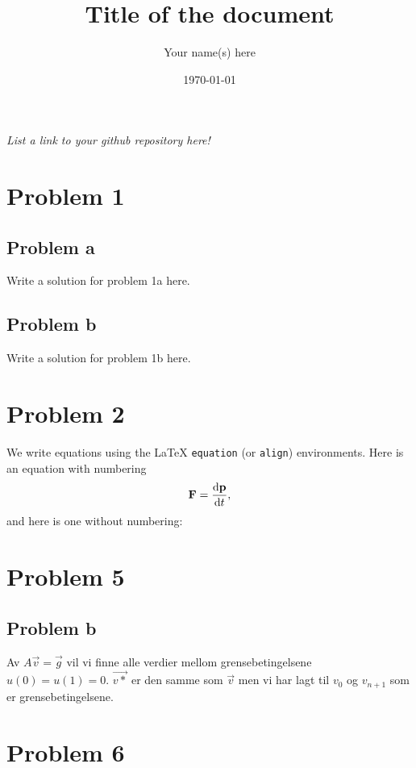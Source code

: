 \documentclass[english,notitlepage]{revtex4-1}  %
\begin{document}
\title{Title of the document}      %
\author{Your name(s) here}          %
\date{\today}                             %
\noaffiliation                            %


\maketitle 
    
\textit{List a link to your github repository here!}
    
\section*{Problem 1}

\subsection*{Problem a}
Write a solution for problem 1a here.

\subsection*{Problem b}
Write a solution for problem 1b here.

\section*{Problem 2}
We write equations using the LaTeX \texttt{equation} (or \texttt{align}) environments. Here is an equation with numbering
\begin{equation}\label{eq:newton}
    \vb{F} = \dv{\vb{p}}{t},
\end{equation}
and here is one without numbering:

\section*{Problem 5}
\subsection{Problem b}
Av $A\vec{v}=\vec{g}$ vil vi finne alle verdier mellom grensebetingelsene $u(0)=u(1)=0$. $\vec{v*}$ er den samme som $\vec{v}$ men vi har lagt til $v_0$ og $v_{n+1}$ som er grensebetingelsene.

\section{Problem 6}
\end{document}
